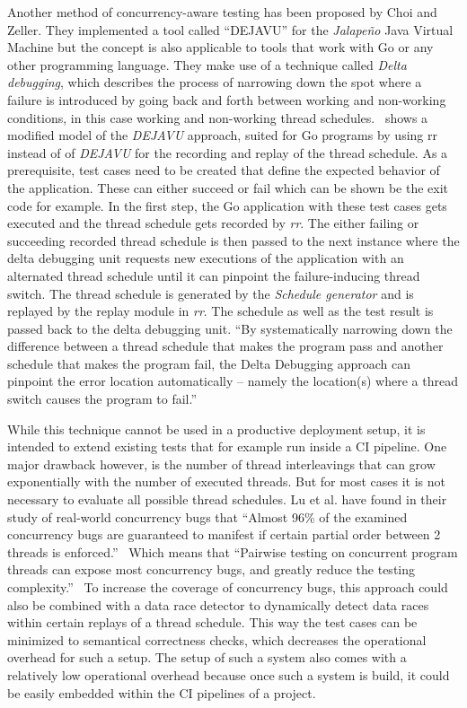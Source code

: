 \documentclass[conference]{IEEEtran}
\begin{document}
Another method of concurrency-aware testing has been proposed by Choi and Zeller.\cite{acm2002}
They implemented a tool called ``DEJAVU'' for the \emph{Jalapeño} Java Virtual Machine but the concept is also applicable to tools that work with Go or any other programming language.
They make use of a technique called \emph{Delta debugging}, which describes the process of narrowing down the spot where a failure is introduced by going back and forth between working and non-working conditions, in this case working and non-working thread schedules.~\cite{zeller2002delta}
 shows a modified model of the \emph{DEJAVU} approach, suited for Go programs by using rr instead of of \emph{DEJAVU} for the recording and replay of the thread schedule.
As a prerequisite, test cases need to be created that define the expected behavior of the application.
These can either succeed or fail which can be shown be the exit code for example.
In the first step, the Go application with these test cases gets executed and the thread schedule gets recorded by \emph{rr}.
The either failing or succeeding recorded thread schedule is then passed to the next instance where the delta debugging unit requests new executions of the application with an alternated thread schedule until it can pinpoint the failure-inducing thread switch.
The thread schedule is generated by the \emph{Schedule generator} and is replayed by the replay module in \emph{rr}.
The schedule as well as the test result is passed back to the delta debugging unit.
``By systematically narrowing down the difference between a thread schedule that makes the program pass and another schedule that makes the program fail, the Delta Debugging approach can pinpoint the error location automatically -- namely the location(s) where a thread switch causes the program to fail.''~\cite{acm2002}

While this technique cannot be used in a productive deployment setup, it is intended to extend existing tests that for example run inside a CI pipeline.
One major drawback however, is the number of thread interleavings that can grow exponentially with the number of executed threads.
But for most cases it is not necessary to evaluate all possible thread schedules.
Lu et al. have found in their study of real-world concurrency bugs that ``Almost 96\% of the examined concurrency bugs are guaranteed to manifest if certain partial order between 2 threads is enforced.''~\cite{lu2008mistakes}
Which means that ``Pairwise testing on concurrent program threads can expose most concurrency bugs, and greatly reduce the testing complexity.''~\cite{lu2008mistakes}
To increase the coverage of concurrency bugs, this approach could also be combined with a data race detector to dynamically detect data races within certain replays of a thread schedule.
This way the test cases can be minimized to semantical correctness checks, which decreases the operational overhead for such a setup.
The setup of such a system also comes with a relatively low operational overhead because once such a system is build, it could be easily embedded within the CI pipelines of a project.
\end{document}
